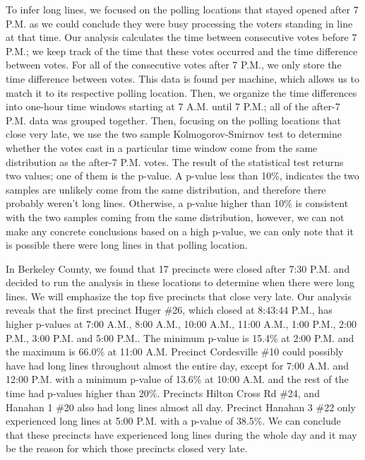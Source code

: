 To infer long lines, we focused on the polling locations that stayed opened after 7 P.M. as we could conclude they were busy processing the voters standing in line at that time. Our analysis calculates the time between consecutive votes before 7 P.M.; we keep track of the time that these votes occurred and the time difference between votes.  For all of the consecutive votes after 7 P.M., we only store the time difference between votes.  This data is found per machine, which allows us to match it to its respective polling location.  Then, we organize the time differences into one-hour time windows starting at 7 A.M. until 7 P.M.; all of the after-7 P.M. data was grouped together.  Then, focusing on the polling locations that close very late, we use the two sample Kolmogorov-Smirnov test to determine whether the votes cast in a particular time window come from the same distribution as the after-7 P.M. votes.  The result of the statistical test returns two values; one of them is the p-value. A p-value less than 10\%, indicates the two samples are unlikely come from the same distribution, and therefore there probably weren't long lines.  Otherwise, a p-value higher than 10\% is consistent with the two samples coming from the same distribution, however, we can not make any concrete conclusions based on a high p-value, we can only note that it is possible there were long lines in that polling location.

In Berkeley County, we found that 17 precincts were closed after 7:30 P.M. and decided to run the analysis in these locations to determine when there were long lines.  We will emphasize the top five precincts that close very late.  Our analysis reveals that the first precinct Huger \#26, which closed at 8:43:44 P.M., has higher p-values at 7:00 A.M., 8:00 A.M., 10:00 A.M., 11:00 A.M., 1:00 P.M., 2:00 P.M., 3:00 P.M. and 5:00 P.M..  The minimum p-value is 15.4\% at 2:00 P.M. and the maximum is 66.0\% at 11:00 A.M.  Precinct Cordesville \#10 could possibly have had long lines throughout almost the entire day, except for 7:00 A.M. and 12:00 P.M. with a minimum p-value of 13.6\% at 10:00 A.M. and the rest of the time had p-values higher than 20\%.  Precincts Hilton Cross Rd \#24, and Hanahan 1 \#20 also had long lines almost all day.  Precinct Hanahan 3 \#22 only experienced long lines at 5:00 P.M. with a p-value of 38.5\%.  We can conclude that these precincts have experienced long lines during the whole day and it may be the reason for which those precincts closed very late.

